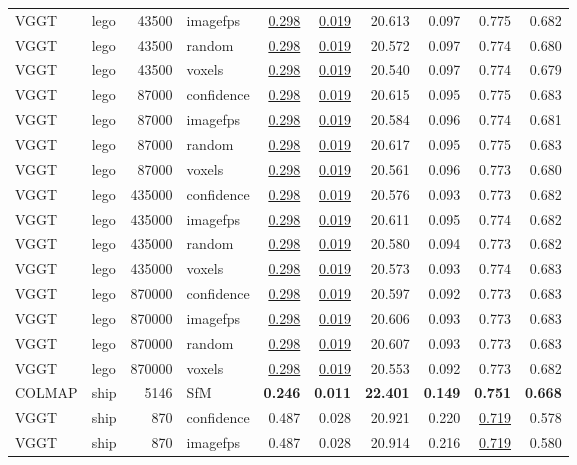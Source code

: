 \begin{table}[H]
\begin{tabular}{llrlrrrrrr}
VGGT & lego & 43500 & imagefps & \underline{0.298} & \underline{0.019} & 20.613 & 0.097 & 0.775 & 0.682 \\
VGGT & lego & 43500 & random & \underline{0.298} & \underline{0.019} & 20.572 & 0.097 & 0.774 & 0.680 \\
VGGT & lego & 43500 & voxels & \underline{0.298} & \underline{0.019} & 20.540 & 0.097 & 0.774 & 0.679 \\
VGGT & lego & 87000 & confidence & \underline{0.298} & \underline{0.019} & 20.615 & 0.095 & 0.775 & 0.683 \\
VGGT & lego & 87000 & imagefps & \underline{0.298} & \underline{0.019} & 20.584 & 0.096 & 0.774 & 0.681 \\
VGGT & lego & 87000 & random & \underline{0.298} & \underline{0.019} & 20.617 & 0.095 & 0.775 & 0.683 \\
VGGT & lego & 87000 & voxels & \underline{0.298} & \underline{0.019} & 20.561 & 0.096 & 0.773 & 0.680 \\
VGGT & lego & 435000 & confidence & \underline{0.298} & \underline{0.019} & 20.576 & 0.093 & 0.773 & 0.682 \\
VGGT & lego & 435000 & imagefps & \underline{0.298} & \underline{0.019} & 20.611 & 0.095 & 0.774 & 0.682 \\
VGGT & lego & 435000 & random & \underline{0.298} & \underline{0.019} & 20.580 & 0.094 & 0.773 & 0.682 \\
VGGT & lego & 435000 & voxels & \underline{0.298} & \underline{0.019} & 20.573 & 0.093 & 0.774 & 0.683 \\
VGGT & lego & 870000 & confidence & \underline{0.298} & \underline{0.019} & 20.597 & 0.092 & 0.773 & 0.683 \\
VGGT & lego & 870000 & imagefps & \underline{0.298} & \underline{0.019} & 20.606 & 0.093 & 0.773 & 0.683 \\
VGGT & lego & 870000 & random & \underline{0.298} & \underline{0.019} & 20.607 & 0.093 & 0.773 & 0.683 \\
VGGT & lego & 870000 & voxels & \underline{0.298} & \underline{0.019} & 20.553 & 0.092 & 0.773 & 0.682 \\
\midrule
COLMAP & ship & 5146 & SfM & \textbf{0.246} & \textbf{0.011} & \textbf{22.401} & \textbf{0.149} & \textbf{0.751} & \textbf{0.668} \\
VGGT & ship & 870 & confidence & 0.487 & 0.028 & 20.921 & 0.220 & \underline{0.719} & 0.578 \\
VGGT & ship & 870 & imagefps & 0.487 & 0.028 & 20.914 & 0.216 & \underline{0.719} & 0.580 \\

\end{tabular}
\end{table}

